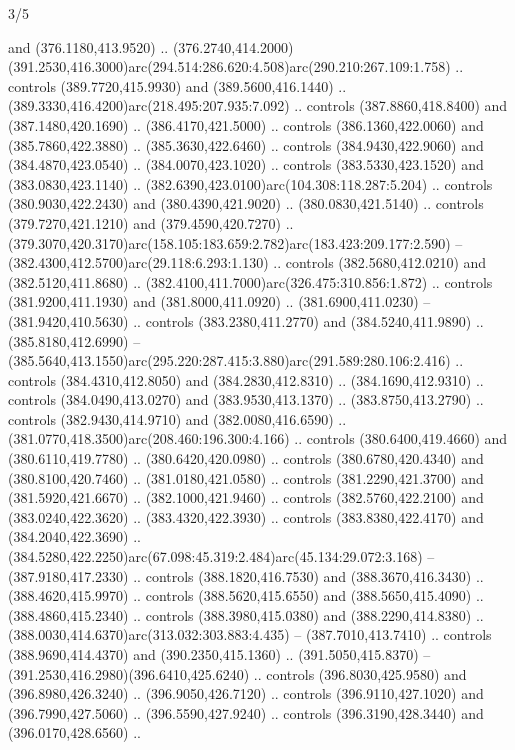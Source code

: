 \begin{flagdescription}{3/5}
\begin{scope}[shift={(0.5\flaglength,0.5\flagwidth)},scale=\flagwidth/510]
\begin{scope}[y=0.80pt, x=0.80pt, yscale=-1.06, xscale=1.06,yshift=-240pt,xshift=-400pt]
\begin{scope}[cm={{0.83333,0.0,0.0,0.83333,(154.64672,48.64761)}}]
\begin{scope}[cm={{0.93334,0.0,0.0,0.93334,(-4.86471,22.64035)}}]
\begin{scope}[draw=black]
  and (376.1180,413.9520) ..
  (376.2740,414.2000)(391.2530,416.3000)arc(294.514:286.620:4.508)arc(290.210:267.109:1.758)
  .. controls (389.7720,415.9930) and (389.5600,416.1440) ..
  (389.3330,416.4200)arc(218.495:207.935:7.092) .. controls (387.8860,418.8400)
  and (387.1480,420.1690) .. (386.4170,421.5000) .. controls (386.1360,422.0060)
  and (385.7860,422.3880) .. (385.3630,422.6460) .. controls (384.9430,422.9060)
  and (384.4870,423.0540) .. (384.0070,423.1020) .. controls (383.5330,423.1520)
  and (383.0830,423.1140) .. (382.6390,423.0100)arc(104.308:118.287:5.204) ..
  controls (380.9030,422.2430) and (380.4390,421.9020) .. (380.0830,421.5140) ..
  controls (379.7270,421.1210) and (379.4590,420.7270) ..
  (379.3070,420.3170)arc(158.105:183.659:2.782)arc(183.423:209.177:2.590) --
  (382.4300,412.5700)arc(29.118:6.293:1.130) .. controls (382.5680,412.0210) and
  (382.5120,411.8680) .. (382.4100,411.7000)arc(326.475:310.856:1.872) ..
  controls (381.9200,411.1930) and (381.8000,411.0920) .. (381.6900,411.0230) --
  (381.9420,410.5630) .. controls (383.2380,411.2770) and (384.5240,411.9890) ..
  (385.8180,412.6990) --
  (385.5640,413.1550)arc(295.220:287.415:3.880)arc(291.589:280.106:2.416) ..
  controls (384.4310,412.8050) and (384.2830,412.8310) .. (384.1690,412.9310) ..
  controls (384.0490,413.0270) and (383.9530,413.1370) .. (383.8750,413.2790) ..
  controls (382.9430,414.9710) and (382.0080,416.6590) ..
  (381.0770,418.3500)arc(208.460:196.300:4.166) .. controls (380.6400,419.4660)
  and (380.6110,419.7780) .. (380.6420,420.0980) .. controls (380.6780,420.4340)
  and (380.8100,420.7460) .. (381.0180,421.0580) .. controls (381.2290,421.3700)
  and (381.5920,421.6670) .. (382.1000,421.9460) .. controls (382.5760,422.2100)
  and (383.0240,422.3620) .. (383.4320,422.3930) .. controls (383.8380,422.4170)
  and (384.2040,422.3690) ..
  (384.5280,422.2250)arc(67.098:45.319:2.484)arc(45.134:29.072:3.168) --
  (387.9180,417.2330) .. controls (388.1820,416.7530) and (388.3670,416.3430) ..
  (388.4620,415.9970) .. controls (388.5620,415.6550) and (388.5650,415.4090) ..
  (388.4860,415.2340) .. controls (388.3980,415.0380) and (388.2290,414.8380) ..
  (388.0030,414.6370)arc(313.032:303.883:4.435) -- (387.7010,413.7410) ..
  controls (388.9690,414.4370) and (390.2350,415.1360) .. (391.5050,415.8370) --
  (391.2530,416.2980)(396.6410,425.6240) .. controls (396.8030,425.9580) and
  (396.8980,426.3240) .. (396.9050,426.7120) .. controls (396.9110,427.1020) and
  (396.7990,427.5060) .. (396.5590,427.9240) .. controls (396.3190,428.3440) and
  (396.0170,428.6560) ..

\end{scope}
\end{scope}
\end{scope}
\end{scope}
\end{scope}
\end{flagdescription}
